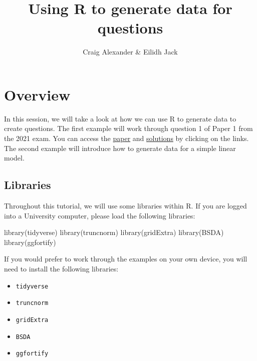 \documentclass[
]{book}
\title{Using R to generate data for questions}
\author{Craig Alexander \& Eilidh Jack}
\date{}
\newenvironment{Shaded}{\begin{snugshade}}{\end{snugshade}}
\newcommand{\FunctionTok}[1]{\textcolor[rgb]{0.00,0.00,0.00}{#1}}
\newcommand{\NormalTok}[1]{#1}
\providecommand{\tightlist}{%
  \setlength{\itemsep}{0pt}\setlength{\parskip}{0pt}}
\begin{document}
\maketitle

{
\setcounter{tocdepth}{1}
\tableofcontents
}
\hypertarget{overview}{%
\chapter{Overview}\label{overview}}

In this session, we will take a look at how we can use R to generate data to create questions. The first example will work through question 1 of Paper 1 from the 2021 exam. You can access the \href{https://www.sqa.org.uk/sqa/files_ccc/NAH_Statistics_Paper1_2021.pdf}{paper} and \href{Advanced\%20Higher\%20Statistic\%20marking\%20instructions\%20paper\%201}{solutions} by clicking on the links. The second example will introduce how to generate data for a simple linear model.

\hypertarget{libraries}{%
\section{Libraries}\label{libraries}}

Throughout this tutorial, we will use some libraries within R. If you are logged into a University computer, please load the following libraries:

\begin{Shaded}
\begin{Highlighting}[]
\FunctionTok{library}\NormalTok{(tidyverse)}
\FunctionTok{library}\NormalTok{(truncnorm)}
\FunctionTok{library}\NormalTok{(gridExtra)}
\FunctionTok{library}\NormalTok{(BSDA)}
\FunctionTok{library}\NormalTok{(ggfortify)}
\end{Highlighting}
\end{Shaded}

If you would prefer to work through the examples on your own device, you will need to install the following libraries:

\begin{itemize}
\tightlist
\item
  \texttt{tidyverse}
\item
  \texttt{truncnorm}
\item
  \texttt{gridExtra}
\item
  \texttt{BSDA}
\item
  \texttt{ggfortify}
\end{itemize}
\end{document}
